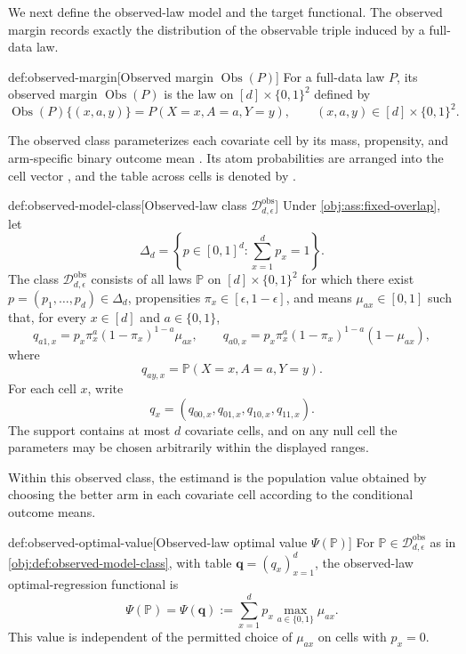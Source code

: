 \documentclass[11pt]{article}
\begin{document}
We next define the observed-law model and the target functional. The observed margin records exactly the distribution of the observable triple induced by a full-data law.

\begin{definitionv}{def:observed-margin}[Observed margin \(\operatorname{Obs}(P)\)]
For a full-data law \(P\), its observed margin \(\operatorname{Obs}(P)\) is the law on \([d]\times\{0,1\}^2\) defined by
\[
\operatorname{Obs}(P)\{(x,a,y)\}
=
P(X=x,A=a,Y=y),
\qquad
(x,a,y)\in[d]\times\{0,1\}^2.
\]
\end{definitionv}

The observed class parameterizes each covariate cell by its mass, propensity, and arm-specific binary outcome mean . Its atom probabilities  are arranged into the cell vector , and the table across cells is denoted by .

\begin{definitionv}{def:observed-model-class}[Observed-law class \(\mathcal D_{d,\epsilon}^{\mathrm{obs}}\)]
Under \cref{obj:ass:fixed-overlap}, let
\[
\Delta_d=\left\{p\in[0,1]^d:\sum_{x=1}^d p_x=1\right\}.
\]
The class \(\mathcal D_{d,\epsilon}^{\mathrm{obs}}\) consists of all laws \(\mathbb P\) on \([d]\times\{0,1\}^2\) for which there exist \(p=(p_1,\ldots,p_d)\in\Delta_d\), propensities \(\pi_x\in[\epsilon,1-\epsilon]\), and means \(\mu_{ax}\in[0,1]\) such that, for every \(x\in[d]\) and \(a\in\{0,1\}\),
\[
q_{a1,x}
=
p_x\pi_x^a(1-\pi_x)^{1-a}\mu_{ax},
\qquad
q_{a0,x}
=
p_x\pi_x^a(1-\pi_x)^{1-a}(1-\mu_{ax}),
\]
where
\[
q_{ay,x}=\mathbb P(X=x,A=a,Y=y).
\]
For each cell \(x\), write
\[
q_x=(q_{00,x},q_{01,x},q_{10,x},q_{11,x}).
\]
The support contains at most \(d\) covariate cells, and on any null cell the parameters may be chosen arbitrarily within the displayed ranges.
\end{definitionv}

Within this observed class, the estimand is the population value obtained by choosing the better arm in each covariate cell according to the conditional outcome means.

\begin{definitionv}{def:observed-optimal-value}[Observed-law optimal value \(\Psi(\mathbb P)\)]
For \(\mathbb P\in\mathcal D_{d,\epsilon}^{\mathrm{obs}}\) as in \cref{obj:def:observed-model-class}, with table \(\mathbf q=(q_x)_{x=1}^d\), the observed-law optimal-regression functional is
\[
\Psi(\mathbb P)=\Psi(\mathbf q)
:=
\sum_{x=1}^d p_x\max_{a\in\{0,1\}}\mu_{ax}.
\]
This value is independent of the permitted choice of \(\mu_{ax}\) on cells with \(p_x=0\).
\end{definitionv}
\end{document}
